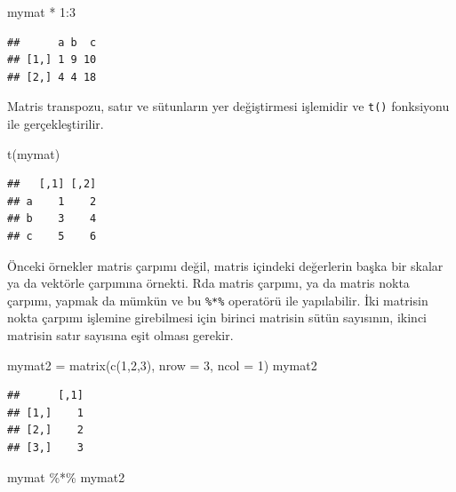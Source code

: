\documentclass[
]{book}
\newenvironment{Shaded}{\begin{snugshade}}{\end{snugshade}}
\newcommand{\AttributeTok}[1]{\textcolor[rgb]{0.77,0.63,0.00}{#1}}
\newcommand{\DecValTok}[1]{\textcolor[rgb]{0.00,0.00,0.81}{#1}}
\newcommand{\FunctionTok}[1]{\textcolor[rgb]{0.00,0.00,0.00}{#1}}
\newcommand{\NormalTok}[1]{#1}
\newcommand{\OtherTok}[1]{\textcolor[rgb]{0.56,0.35,0.01}{#1}}
\newcommand{\SpecialCharTok}[1]{\textcolor[rgb]{0.00,0.00,0.00}{#1}}
\begin{document}
\begin{Shaded}
\begin{Highlighting}[]
\NormalTok{mymat }\SpecialCharTok{*} \DecValTok{1}\SpecialCharTok{:}\DecValTok{3}
\end{Highlighting}
\end{Shaded}

\begin{verbatim}
##      a b  c
## [1,] 1 9 10
## [2,] 4 4 18
\end{verbatim}

Matris transpozu, satır ve sütunların yer değiştirmesi işlemidir ve \texttt{t()} fonksiyonu ile gerçekleştirilir.

\begin{Shaded}
\begin{Highlighting}[]
\FunctionTok{t}\NormalTok{(mymat)}
\end{Highlighting}
\end{Shaded}

\begin{verbatim}
##   [,1] [,2]
## a    1    2
## b    3    4
## c    5    6
\end{verbatim}

Önceki örnekler matris çarpımı değil, matris içindeki değerlerin başka bir skalar ya da vektörle çarpımına örnekti. Rda matris çarpımı, ya da matris nokta çarpımı, yapmak da mümkün ve bu \texttt{\%*\%} operatörü ile yapılabilir. İki matrisin nokta çarpımı işlemine girebilmesi için birinci matrisin sütün sayısının, ikinci matrisin satır sayısına eşit olması gerekir.

\begin{Shaded}
\begin{Highlighting}[]
\NormalTok{mymat2 }\OtherTok{=} \FunctionTok{matrix}\NormalTok{(}\FunctionTok{c}\NormalTok{(}\DecValTok{1}\NormalTok{,}\DecValTok{2}\NormalTok{,}\DecValTok{3}\NormalTok{), }\AttributeTok{nrow =} \DecValTok{3}\NormalTok{, }\AttributeTok{ncol =} \DecValTok{1}\NormalTok{)}
\NormalTok{mymat2}
\end{Highlighting}
\end{Shaded}

\begin{verbatim}
##      [,1]
## [1,]    1
## [2,]    2
## [3,]    3
\end{verbatim}

\begin{Shaded}
\begin{Highlighting}[]
\NormalTok{mymat }\SpecialCharTok{\%*\%}\NormalTok{ mymat2}
\end{Highlighting}
\end{Shaded}
\end{document}
